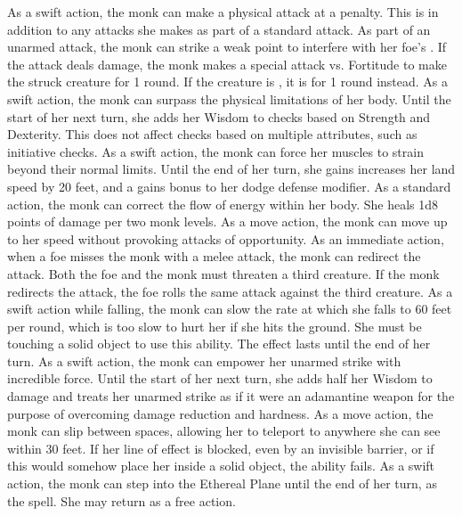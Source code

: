  As a swift action, the monk can make a physical attack at a  penalty. This is in addition to any attacks she makes as part of a standard attack.
 As part of an unarmed attack, the monk can strike a weak point to interfere with her foe's \ki. If the attack deals damage, the monk makes a special attack vs. Fortitude to make the struck creature \staggered for 1 round. If the creature is \bloodied, it is \stunned for 1 round instead.
 As a swift action, the monk can surpass the physical limitations of her body. Until the start of her next turn, she adds her Wisdom to checks based on Strength and Dexterity. This does not affect checks based on multiple attributes, such as initiative checks.
 As a swift action, the monk can force her muscles to strain beyond their normal limits. Until the end of her turn, she gains increases her land speed by 20 feet, and a gains  bonus to her dodge defense modifier.
 As a standard action, the monk can correct the flow of energy within her body. She heals 1d8 points of damage per two monk levels.
 As a move action, the monk can move up to her speed without provoking attacks of opportunity.
 As an immediate action, when a foe misses the monk with a melee attack, the monk can redirect the attack. Both the foe and the monk must threaten a third creature. If the monk redirects the attack, the foe rolls the same attack against the third creature.
 As a swift action while falling, the monk can slow the rate at which she falls to 60 feet per round, which is too slow to hurt her if she hits the ground. She must be touching a solid object to use this ability. The effect lasts until the end of her turn.
 As a swift action, the monk can empower her unarmed strike with incredible force. Until the start of her next turn, she adds half her Wisdom to damage and treats her unarmed strike as if it were an adamantine weapon for the purpose of overcoming damage reduction and hardness.
 As a move action, the monk can slip between spaces, allowing her to teleport to anywhere she can see within 30 feet. If her line of effect is blocked, even by an invisible barrier, or if this would somehow place her inside a solid object, the ability fails. 
 As a swift action, the monk can step into the Ethereal Plane until the end of her turn, as the  spell. She may return as a free action.
